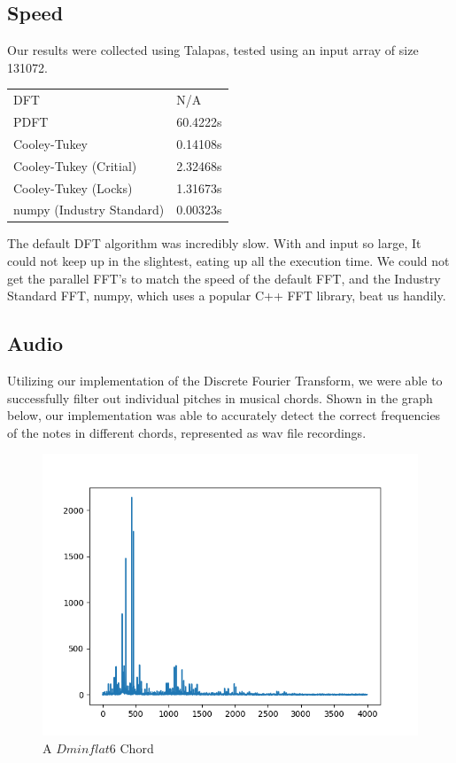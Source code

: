 \documentclass[12pt]{extarticle}
\begin{document}
	\subsection*{Speed}
		Our results were collected using Talapas, tested using an input array of size 131072.

\begin{table}[h]
\begin{tabular}{ll}
DFT & N/A \\
PDFT & 60.4222s \\
Cooley-Tukey & 0.14108s \\
Cooley-Tukey (Critial) & 2.32468s \\
Cooley-Tukey (Locks) & 1.31673s \\
numpy (Industry Standard) & 0.00323s
\end{tabular}
\end{table}

	The default DFT algorithm was incredibly slow. With and input so large, It could not keep up in the slightest, eating up all the execution time.
	We could not get the parallel FFT's to match the speed of the default FFT, and the Industry Standard FFT, numpy, which uses a popular C++ FFT library, beat us handily.

\subsection*{Audio}
Utilizing our implementation of the Discrete Fourier Transform, we were able to successfully filter out individual pitches in musical
chords. Shown in the graph below, our implementation was able to accurately detect the correct frequencies of the notes in different chords, 
represented as wav file recordings.

\begin{figure}[h]
  \includegraphics[scale=0.75]{./images/pitchgraph.png}
  \caption{A $Dminflat6$ Chord}
\end{figure}
\end{document}
